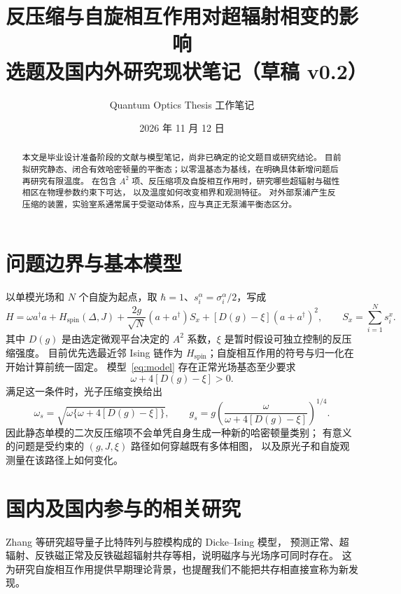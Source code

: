\documentclass[UTF8,11pt,a4paper]{ctexart}
\title{反压缩与自旋相互作用对超辐射相变的影响\\[0.4em]
\large 选题及国内外研究现状笔记（草稿 v0.2）}
\author{Quantum Optics Thesis 工作笔记}
\date{2026 年 11 月 12 日}
\begin{document}
\maketitle

\begin{abstract}
本文是毕业设计准备阶段的文献与模型笔记，尚非已确定的论文题目或研究结论。
目前拟研究静态、闭合有效哈密顿量的平衡态；以零温基态为基线，在明确具体新增问题后再研究有限温度。
在包含 $A^2$ 项、反压缩项及自旋相互作用时，研究哪些超辐射与磁性相区在物理参数约束下可达，
以及温度如何改变相界和观测特征。
对外部泵浦产生反压缩的装置，实验室系通常属于受驱动体系，应与真正无泵浦平衡态区分。
\end{abstract}

\section{问题边界与基本模型}

以单模光场和 $N$ 个自旋为起点，取 $\hbar=1$、$s_i^\alpha=\sigma_i^\alpha/2$，写成
\begin{equation}
 H=\omega a^\dagger a+H_{\mathrm{spin}}(\Delta,J)
 +\frac{2g}{\sqrt N}(a+a^\dagger)S_x
 +[D(g)-\xi](a+a^\dagger)^2,
 \qquad S_x=\sum_{i=1}^{N}s_i^x .
 \label{eq:model}
\end{equation}
其中 $D(g)$ 是由选定微观平台决定的 $A^2$ 系数，$\xi$ 是暂时假设可独立控制的反压缩强度。
目前优先选最近邻 Ising 链作为 $H_{\mathrm{spin}}$；自旋相互作用的符号与归一化在开始计算前统一固定。
模型~\eqref{eq:model} 存在正常光场基态至少要求
\begin{equation}
  \omega+4[D(g)-\xi]>0 . \label{eq:stability}
\end{equation}
满足这一条件时，光子压缩变换给出
\begin{equation}
 \omega_s=\sqrt{\omega\{\omega+4[D(g)-\xi]\}},\qquad
 g_s=g\left(\frac{\omega}{\omega+4[D(g)-\xi]}\right)^{1/4}.
 \label{eq:squeezed}
\end{equation}
因此静态单模的二次反压缩项不会单凭自身生成一种新的哈密顿量类别；
有意义的问题是受约束的 $(g,J,\xi)$ 路径如何穿越既有多体相图，
以及原光子和自旋观测量在该路径上如何变化。

\section{国内及国内参与的相关研究}

Zhang 等研究超导量子比特阵列与腔模构成的 Dicke--Ising 模型，
预测正常、超辐射、反铁磁正常及反铁磁超辐射共存等相，说明磁序与光场序可同时存在\cite{Zhang2014CircuitIsing}。
这为研究自旋相互作用提供早期理论背景，也提醒我们不能把共存相直接宣称为新发现。
\end{document}
